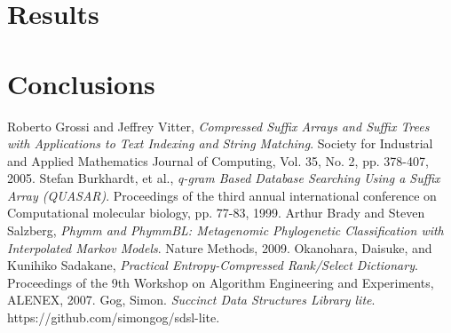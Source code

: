 \documentclass{article}
\begin{document}
\section{Results}
\label{sec-results}

\section{Conclusions}
\label{sec-conclusions}

\begin{thebibliography}{1}
	Roberto Grossi and Jeffrey Vitter,
	\emph{Compressed Suffix Arrays and Suffix Trees with Applications to Text Indexing and String Matching}.
	Society for Industrial and Applied Mathematics Journal of Computing,
	Vol. 35, No. 2, pp. 378-407,
	2005.
	Stefan Burkhardt, et al.,
	\emph{q-gram Based Database Searching Using a Suffix Array (QUASAR)}.
	Proceedings of the third annual international conference on Computational molecular biology,
	pp. 77-83,
	1999.
	Arthur Brady and Steven Salzberg,
	\emph{Phymm and PhymmBL: Metagenomic Phylogenetic Classification with Interpolated Markov Models}.
	Nature Methods,
	2009.
	Okanohara, Daisuke, and Kunihiko Sadakane,
	\emph{Practical Entropy-Compressed Rank/Select Dictionary}. 
	Proceedings of the 9th Workshop on Algorithm Engineering and Experiments,
	ALENEX,
	2007.
	Gog, Simon.
	\emph{Succinct Data Structures Library lite}.
	https://github.com/simongog/sdsl-lite.
\end{thebibliography}
\end{document}
